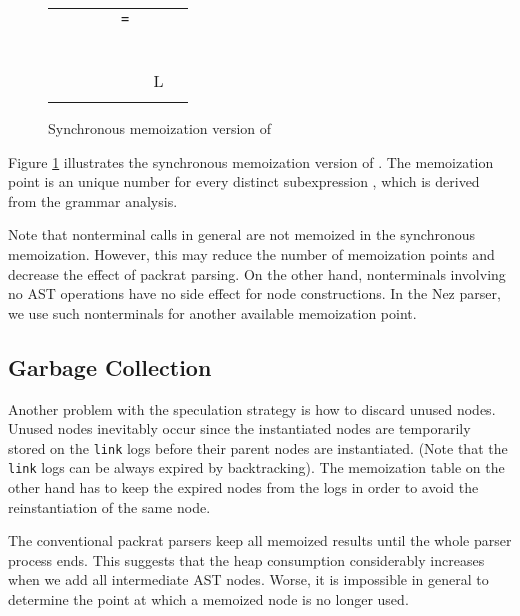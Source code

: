\documentclass[JIP]{ipsj}
\begin{document}
\begin{figure}[tb]
\begin{tabular}{p{1cm}rrl} 
      &  \verb|      = | & &   \\
 &  & &   \\
 &  & &   \\
 &  & &   \\
 & & &   \\
 &  & &   \\
 &  & &   \\
 &  & L &   \\
 &  &  &   \\ 
\end{tabular}
\caption{Synchronous memoization version of }
\label{fig:memolink}
\end{figure}

Figure \ref{fig:memolink} illustrates the synchronous memoization version of . The memoization point  is an unique number for every distinct subexpression , which is derived from the grammar analysis. 

Note that nonterminal calls in general are not memoized in the synchronous memoization. However, this may reduce the number of memoization points and decrease the effect of packrat parsing. On the other hand, nonterminals involving no AST operations have no side effect for node constructions. In the Nez parser, we use such nonterminals for another available memoization point. 

\subsection{Garbage Collection}

Another problem with the speculation strategy is how to discard unused nodes. 
Unused nodes inevitably occur since the instantiated nodes are temporarily stored on the {\tt link} logs before their parent nodes are instantiated. (Note that the {\tt link} logs can be always expired by backtracking). 
The memoization table on the other hand has to keep the expired nodes from the logs in order to avoid the reinstantiation of the same node.

The conventional packrat parsers keep all memoized results until the whole parser process ends\cite{ICFP02_PackratParsing}. This suggests that the heap consumption considerably increases when we add all intermediate AST nodes. Worse, it is impossible in general to determine the point at which a memoized node is no longer used\cite{PASTE10_Yapp}. 
\end{document}
